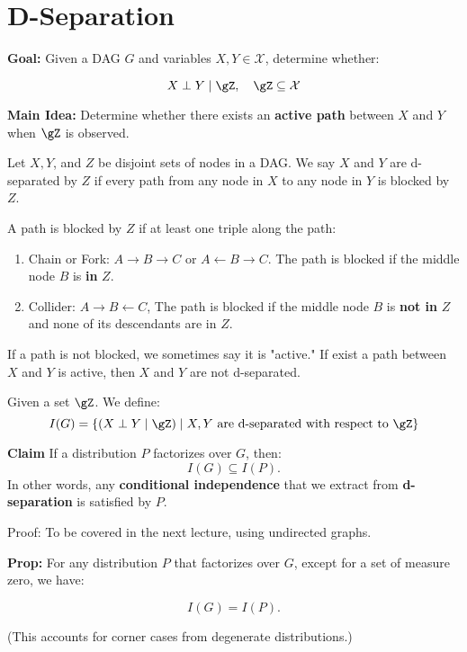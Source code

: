 \documentclass{article}%
\begin{document}
\section{D-Separation}
\textbf{Goal:} Given a DAG \( G \) and variables \( X, Y \in \mathcal{X} \), determine whether:

\[
X \perp Y \mid \gZ, \quad \gZ \subseteq \mathcal{X}
\]

\textbf{Main Idea:} Determine whether there exists an \textbf{active path} between \( X \) and \( Y \) when \( \gZ \) is observed.


\begin{definition}[D-Separation]
    Let $X, Y$, and $Z$ be disjoint sets of nodes in a DAG. We say $X$ and $Y$ are d-separated by $Z$ if every path from any node in $X$ to any node in $Y$ is blocked by $Z$.

A path is blocked by $Z$ if at least one triple along the path:
\begin{enumerate}
    \item Chain or Fork: $A \rightarrow B \rightarrow C$ or $A \leftarrow B \rightarrow C$. The path is blocked if the middle node $B$ is \textbf{in} $Z$.
    \item Collider: $A \rightarrow B \leftarrow C$, The path is blocked if the middle node $B$ is \textbf{not in} $Z$ and none of its descendants are in $Z$.
\end{enumerate}

If a path is not blocked, we sometimes say it is "active." If exist a path between $X$ and $Y$ is active, then $X$ and $Y$ are not d-separated.

Given a set \( \gZ \). We define:
    \[
    I(G) = \left\{ (X \perp Y \mid \gZ) \mid X, Y \text{ are d-separated with respect to } \gZ \right\}
    \]
\end{definition}




\textbf{Claim}
If a distribution \( P \) factorizes over \( G \), then:
\[
I(G) \subseteq I(P).
\]
In other words, any \textbf{conditional independence} that we extract from \textbf{d-separation} is satisfied by \( P \).

Proof: To be covered in the next lecture, using undirected graphs.

\textbf{Prop:}
For any distribution \( P \) that factorizes over \( G \), except for a set of measure zero, we have:

\[
I(G) = I(P).
\]

(This accounts for corner cases from degenerate distributions.)
\end{document}
